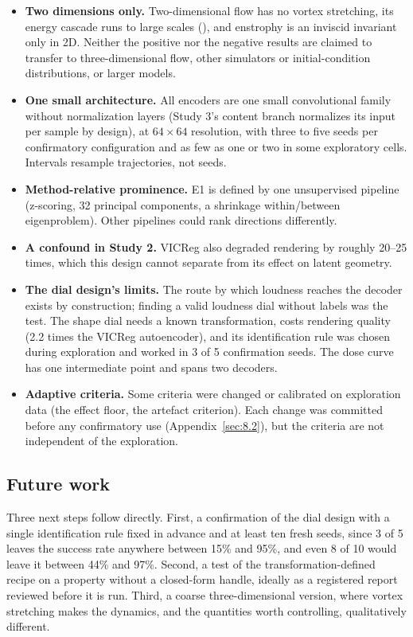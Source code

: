 \documentclass[10pt]{article}
\begin{document}
\begin{itemize}
\item \textbf{Two dimensions only.} Two-dimensional flow has no vortex stretching, its energy cascade runs to large scales (\citealp{kraichnan1967}), and enstrophy is an inviscid invariant only in 2D. Neither the positive nor the negative results are claimed to transfer to three-dimensional flow, other simulators or initial-condition distributions, or larger models.
\item \textbf{One small architecture.} All encoders are one small convolutional family without normalization layers (Study 3's content branch normalizes its input per sample by design), at $64 \times 64$ resolution, with three to five seeds per confirmatory configuration and as few as one or two in some exploratory cells. Intervals resample trajectories, not seeds.
\item \textbf{Method-relative prominence.} E1 is defined by one unsupervised pipeline (z-scoring, 32 principal components, a shrinkage within/between eigenproblem). Other pipelines could rank directions differently.
\item \textbf{A confound in Study 2.} VICReg also degraded rendering by roughly 20--25 times, which this design cannot separate from its effect on latent geometry.
\item \textbf{The dial design's limits.} The route by which loudness reaches the decoder exists by construction; finding a valid loudness dial without labels was the test. The shape dial needs a known transformation, costs rendering quality (2.2 times the VICReg autoencoder), and its identification rule was chosen during exploration and worked in 3 of 5 confirmation seeds. The dose curve has one intermediate point and spans two decoders.
\item \textbf{Adaptive criteria.} Some criteria were changed or calibrated on exploration data (the effect floor, the artefact criterion). Each change was committed before any confirmatory use (Appendix~\ref{sec:8.2}), but the criteria are not independent of the exploration.
\end{itemize}

\subsection{Future work}\label{sec:7.6}

Three next steps follow directly. First, a confirmation of the dial design with a single identification rule fixed in advance and at least ten fresh seeds, since 3 of 5 leaves the success rate anywhere between 15\% and 95\%, and even 8 of 10 would leave it between 44\% and 97\%. Second, a test of the transformation-defined recipe on a property without a closed-form handle, ideally as a registered report reviewed before it is run. Third, a coarse three-dimensional version, where vortex stretching makes the dynamics, and the quantities worth controlling, qualitatively different.
\end{document}
